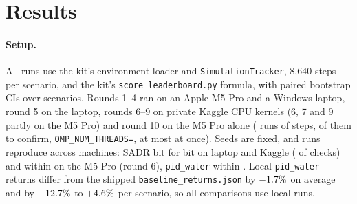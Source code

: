 \documentclass{article}
\begin{document}
\section{Results}
\label{sec:results}

\paragraph{Setup.} All runs use the kit's environment loader and \texttt{SimulationTracker}, 8,640 steps per scenario, and the kit's \texttt{score\_leaderboard.py} formula, with paired bootstrap CIs over scenarios. Rounds 1--4 ran on an Apple M5 Pro and a Windows laptop, round 5 on the laptop, rounds 6--9 on private Kaggle CPU kernels (6, 7 and 9 partly on the M5 Pro) and round 10 on the M5 Pro alone (\RTenMacRuns{} runs of \RTenSteps{} steps, \RTenMacConfRuns{} of them to confirm, \texttt{OMP\_NUM\_THREADS=\RTenOmpThreads}, at most \RTenMacWorkersMax{} at once). Seeds are fixed, and runs reproduce across machines: SADR bit for bit on laptop and Kaggle (\RSixReproIdentical{} of \RSixReproN{} checks) and within \RSixMacReproMaxRel{} on the M5 Pro (round 6), \texttt{pid\_water} within \MachineGapPidWater. Local \texttt{pid\_water} returns differ from the shipped \texttt{baseline\_returns.json} by $-1.7\%$ on average and by $-12.7\%$ to $+4.6\%$ per scenario, so all comparisons use local runs.


\end{document}
